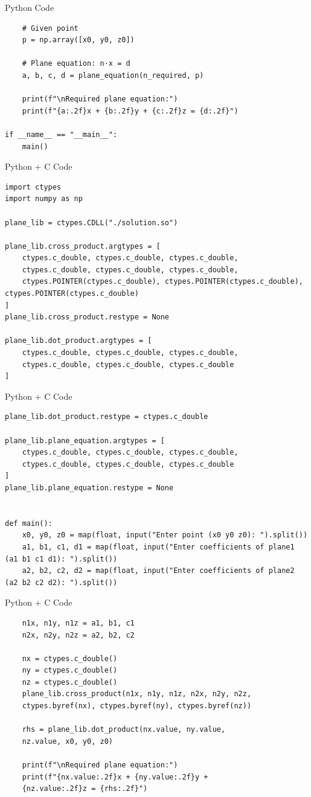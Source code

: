 \documentclass{beamer}
\begin{document}
\begin{frame}[fragile]{Python Code}
    \begin{verbatim}
    # Given point
    p = np.array([x0, y0, z0])

    # Plane equation: n·x = d
    a, b, c, d = plane_equation(n_required, p)

    print(f"\nRequired plane equation:")
    print(f"{a:.2f}x + {b:.2f}y + {c:.2f}z = {d:.2f}")

if __name__ == "__main__":
    main()
    \end{verbatim}
\end{frame}

\begin{frame}[fragile]{Python + C Code}
    \begin{verbatim}
import ctypes
import numpy as np

plane_lib = ctypes.CDLL("./solution.so")

plane_lib.cross_product.argtypes = [
    ctypes.c_double, ctypes.c_double, ctypes.c_double,
    ctypes.c_double, ctypes.c_double, ctypes.c_double,
    ctypes.POINTER(ctypes.c_double), ctypes.POINTER(ctypes.c_double), ctypes.POINTER(ctypes.c_double)
]
plane_lib.cross_product.restype = None

plane_lib.dot_product.argtypes = [
    ctypes.c_double, ctypes.c_double, ctypes.c_double,
    ctypes.c_double, ctypes.c_double, ctypes.c_double
]
    \end{verbatim}
\end{frame}

\begin{frame}[fragile]{Python + C Code}
    \begin{verbatim}
plane_lib.dot_product.restype = ctypes.c_double

plane_lib.plane_equation.argtypes = [
    ctypes.c_double, ctypes.c_double, ctypes.c_double,
    ctypes.c_double, ctypes.c_double, ctypes.c_double
]
plane_lib.plane_equation.restype = None


def main():
    x0, y0, z0 = map(float, input("Enter point (x0 y0 z0): ").split())
    a1, b1, c1, d1 = map(float, input("Enter coefficients of plane1 (a1 b1 c1 d1): ").split())
    a2, b2, c2, d2 = map(float, input("Enter coefficients of plane2 (a2 b2 c2 d2): ").split())
    \end{verbatim}
\end{frame}

\begin{frame}[fragile]{Python + C Code}
    \begin{verbatim}
    n1x, n1y, n1z = a1, b1, c1
    n2x, n2y, n2z = a2, b2, c2

    nx = ctypes.c_double()
    ny = ctypes.c_double()
    nz = ctypes.c_double()
    plane_lib.cross_product(n1x, n1y, n1z, n2x, n2y, n2z,
    ctypes.byref(nx), ctypes.byref(ny), ctypes.byref(nz))

    rhs = plane_lib.dot_product(nx.value, ny.value, 
    nz.value, x0, y0, z0)

    print(f"\nRequired plane equation:")
    print(f"{nx.value:.2f}x + {ny.value:.2f}y + 
    {nz.value:.2f}z = {rhs:.2f}")
    \end{verbatim}
\end{frame}
\end{document}

